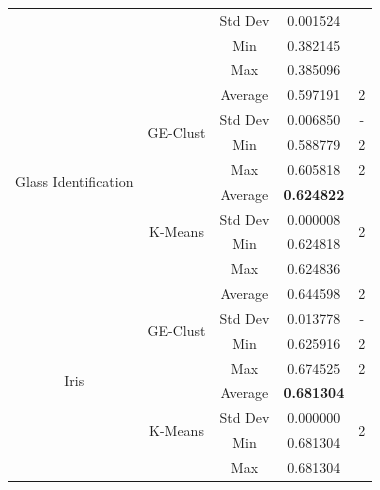 \documentclass[conference]{IEEEtran}
\begin{document}
\begin{table}[!htb]
\begin{tabular}{|c|c|c|c|c|}
			&                           & Std Dev             & 0.001524          &                    \\ \cline{3-4}
			&                           & Min                 & 0.382145          &                    \\ \cline{3-4}
			&                           & Max                 & 0.385096          &                    \\ \hline
			\multirow{8}{*}{Glass Identification}                                            & \multirow{4}{*}{GE-Clust} & Average             & 0.597191          & 2                  \\ \cline{3-5} 
			&                           & Std Dev             & 0.006850          & -                  \\ \cline{3-5} 
			&                           & Min                 & 0.588779          & 2                  \\ \cline{3-5} 
			&                           & Max                 & 0.605818          & 2                  \\ \cline{2-5} 
			& \multirow{4}{*}{K-Means}  & Average             & \textbf{0.624822} & \multirow{4}{*}{2} \\ \cline{3-4}
			&                           & Std Dev             & 0.000008          &                    \\ \cline{3-4}
			&                           & Min                 & 0.624818          &                    \\ \cline{3-4}
			&                           & Max                 & 0.624836          &                    \\ \hline
			\multirow{8}{*}{Iris}                                                            & \multirow{4}{*}{GE-Clust} & Average             & 0.644598          & 2                  \\ \cline{3-5} 
			&                           & Std Dev             & 0.013778          & -                  \\ \cline{3-5} 
			&                           & Min                 & 0.625916          & 2                  \\ \cline{3-5} 
			&                           & Max                 & 0.674525          & 2                  \\ \cline{2-5} 
			& \multirow{4}{*}{K-Means}  & Average             & \textbf{0.681304} & \multirow{4}{*}{2} \\ \cline{3-4}
			&                           & Std Dev             & 0.000000          &                    \\ \cline{3-4}
			&                           & Min                 & 0.681304          &                    \\ \cline{3-4}
			&                           & Max                 & 0.681304          &                    \\ \hline
		\end{tabular}
	\end{table}
	
\end{document}
